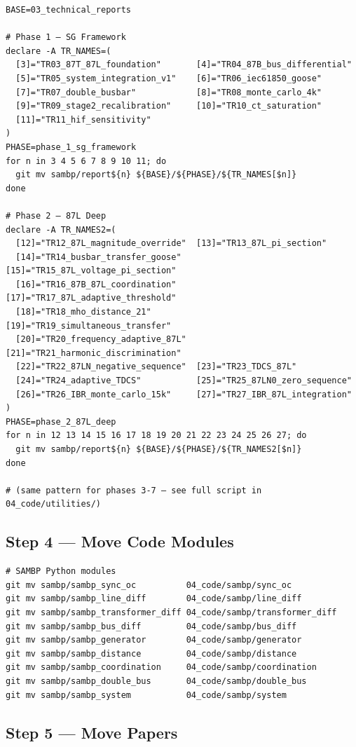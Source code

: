 \documentclass[11pt,a4paper]{article}
\begin{document}
\begin{verbatim}
BASE=03_technical_reports

# Phase 1 — SG Framework
declare -A TR_NAMES=(
  [3]="TR03_87T_87L_foundation"       [4]="TR04_87B_bus_differential"
  [5]="TR05_system_integration_v1"    [6]="TR06_iec61850_goose"
  [7]="TR07_double_busbar"            [8]="TR08_monte_carlo_4k"
  [9]="TR09_stage2_recalibration"     [10]="TR10_ct_saturation"
  [11]="TR11_hif_sensitivity"
)
PHASE=phase_1_sg_framework
for n in 3 4 5 6 7 8 9 10 11; do
  git mv sambp/report${n} ${BASE}/${PHASE}/${TR_NAMES[$n]}
done

# Phase 2 — 87L Deep
declare -A TR_NAMES2=(
  [12]="TR12_87L_magnitude_override"  [13]="TR13_87L_pi_section"
  [14]="TR14_busbar_transfer_goose"   [15]="TR15_87L_voltage_pi_section"
  [16]="TR16_87B_87L_coordination"    [17]="TR17_87L_adaptive_threshold"
  [18]="TR18_mho_distance_21"         [19]="TR19_simultaneous_transfer"
  [20]="TR20_frequency_adaptive_87L"  [21]="TR21_harmonic_discrimination"
  [22]="TR22_87LN_negative_sequence"  [23]="TR23_TDCS_87L"
  [24]="TR24_adaptive_TDCS"           [25]="TR25_87LN0_zero_sequence"
  [26]="TR26_IBR_monte_carlo_15k"     [27]="TR27_IBR_87L_integration"
)
PHASE=phase_2_87L_deep
for n in 12 13 14 15 16 17 18 19 20 21 22 23 24 25 26 27; do
  git mv sambp/report${n} ${BASE}/${PHASE}/${TR_NAMES2[$n]}
done

# (same pattern for phases 3-7 — see full script in 04_code/utilities/)
\end{verbatim}

\subsection{Step 4 — Move Code Modules}

\begin{verbatim}
# SAMBP Python modules
git mv sambp/sambp_sync_oc          04_code/sambp/sync_oc
git mv sambp/sambp_line_diff        04_code/sambp/line_diff
git mv sambp/sambp_transformer_diff 04_code/sambp/transformer_diff
git mv sambp/sambp_bus_diff         04_code/sambp/bus_diff
git mv sambp/sambp_generator        04_code/sambp/generator
git mv sambp/sambp_distance         04_code/sambp/distance
git mv sambp/sambp_coordination     04_code/sambp/coordination
git mv sambp/sambp_double_bus       04_code/sambp/double_bus
git mv sambp/sambp_system           04_code/sambp/system
\end{verbatim}

\subsection{Step 5 — Move Papers}
\end{document}
